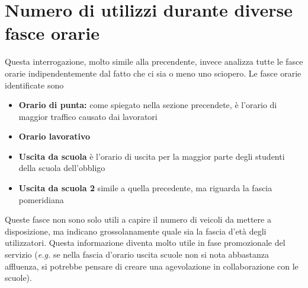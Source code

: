 \section{Numero di utilizzi durante diverse fasce orarie}
Questa interrogazione, molto simile alla precendente, invece analizza
tutte le fasce orarie indipendentemente dal fatto che ci sia o meno uno sciopero.
Le fasce orarie identificate sono
\begin{itemize}
	\item{\textbf{Orario di punta:} come spiegato nella sezione precendete, è l'orario di maggior traffico causato dai lavoratori}
	\item{\textbf{Orario lavorativo}}
	\item{\textbf{Uscita da scuola} è l'orario di uscita per la maggior parte degli studenti della scuola dell'obbligo}
	\item{\textbf{Uscita da scuola 2} simile a quella precedente, ma riguarda la fascia pomeridiana}
\end{itemize}

Queste fasce non sono solo utili a capire il numero di veicoli da mettere a disposizione, ma indicano grossolanamente quale sia 
la fascia d'età degli utilizzatori. Questa informazione diventa molto utile in fase promozionale del servizio (\emph{e.g.} se nella fascia d'orario
uscita scuole non si nota abbastanza affluenza, si potrebbe pensare di creare una agevolazione in collaborazione con le scuole).

